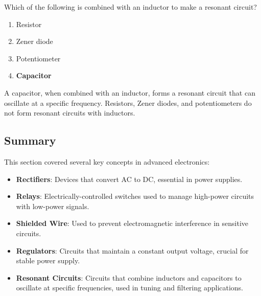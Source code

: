 
\begin{tcolorbox}[colback=gray!10!white,colframe=black!75!black,title={T6D08}]
    Which of the following is combined with an inductor to make a resonant circuit?
    \begin{enumerate}[label=\Alph*),noitemsep]
        \item Resistor
        \item Zener diode
        \item Potentiometer
        \item \textbf{Capacitor}
    \end{enumerate}
\end{tcolorbox}
A capacitor, when combined with an inductor, forms a resonant circuit that can oscillate at a specific frequency. Resistors, Zener diodes, and potentiometers do not form resonant circuits with inductors.


\subsection*{Summary}
This section covered several key concepts in advanced electronics:
\begin{itemize}
    \item \textbf{Rectifiers}: Devices that convert AC to DC, essential in power supplies.
    \item \textbf{Relays}: Electrically-controlled switches used to manage high-power circuits with low-power signals.
    \item \textbf{Shielded Wire}: Used to prevent electromagnetic interference in sensitive circuits.
    \item \textbf{Regulators}: Circuits that maintain a constant output voltage, crucial for stable power supply.
    \item \textbf{Resonant Circuits}: Circuits that combine inductors and capacitors to oscillate at specific frequencies, used in tuning and filtering applications.
\end{itemize}
